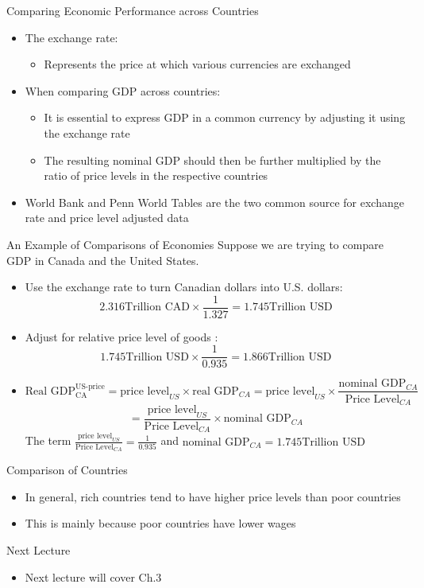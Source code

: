 \documentclass[aspectratio=1610]{beamer}
\begin{document}
\begin{frame}[wide]{Comparing Economic Performance across Countries}
	\begin{itemize}
		\item The exchange rate:
		\begin{itemize}
			\item Represents the price at which various currencies are exchanged
		\end{itemize}
		\item When comparing GDP across countries:
		\begin{itemize}
			\item It is essential to express GDP in a common currency by adjusting it using the exchange rate
			\item The resulting nominal GDP should then be further multiplied by the ratio of price levels in the respective countries
		\end{itemize}
		\item World Bank and Penn World Tables are the two common source for exchange rate and price level adjusted data
	\end{itemize}
\end{frame}

\begin{frame}[wide]{An Example of Comparisons of Economies}
	Suppose we are trying to compare GDP in Canada and the United States. 
	\begin{itemize}
		\item Use the exchange rate to turn Canadian dollars into U.S. dollars:
		\[2.316 \mbox{Trillion CAD}\times \frac{1}{1.327} = 1.745 \mbox{Trillion USD}\]
		\item Adjust for relative price level of goods :
		\[1.745 \mbox{Trillion USD} \times  \frac{1}{0.935} =  1.866 \mbox{Trillion USD}\]
		\item 
		\[\mbox{Real GDP}^{\mbox{US-price}}_{\mbox{CA}}  = \mbox{price level}_{US} \times \mbox{real GDP}_{CA} = \mbox{price level}_{US} \times \frac{\mbox{nominal GDP}_{CA}}{\mbox{Price Level}_{CA}}\]
		\[  = \frac{\mbox{price level}_{US}}{\mbox{Price Level}_{CA}} \times \mbox{nominal GDP}_{CA}\]
		The term $\frac{\mbox{price level}_{US}}{\mbox{Price Level}_{CA}} = \frac{1}{0.935}$ and $\mbox{nominal GDP}_{CA} = 1.745 \mbox{Trillion USD}$
	\end{itemize}
\end{frame}

\begin{frame}[wide]{Comparison of Countries}
	\begin{itemize}
		\item In general, rich countries tend to have higher price levels than poor countries
		\item This is mainly because poor countries have lower wages
		
	\end{itemize}
\end{frame}

\begin{frame}[wide]{Next Lecture}
	\begin{itemize}
		\item Next lecture will cover Ch.3
	\end{itemize}
\end{frame}
\end{document}
